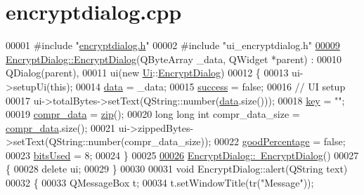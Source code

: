 \hypertarget{encryptdialog_8cpp_source}{}\section{encryptdialog.\+cpp}
\label{encryptdialog_8cpp_source}

\begin{DoxyCode}
00001 \textcolor{preprocessor}{#include "\hyperlink{encryptdialog_8h}{encryptdialog.h}"}
00002 \textcolor{preprocessor}{#include "ui\_encryptdialog.h"}
\hypertarget{encryptdialog_8cpp_source.tex_l00009}{}\hyperlink{class_encrypt_dialog_ab57e8b3a0d00c977e81f3b356657524e}{00009} \hyperlink{class_encrypt_dialog_ab57e8b3a0d00c977e81f3b356657524e}{EncryptDialog::EncryptDialog}(QByteArray \_data, QWidget *parent) :
00010     QDialog(parent),
00011     ui(new \hyperlink{namespace_ui}{Ui}::\hyperlink{class_encrypt_dialog}{EncryptDialog})
00012 \{
00013     ui->setupUi(\textcolor{keyword}{this});
00014     \hyperlink{class_encrypt_dialog_acf3a8bbce90d99ef17fec093c35b1008}{data} = \_data;
00015     \hyperlink{class_encrypt_dialog_ada4900bcd40894d9c098c65aa4066ac9}{success} = \textcolor{keyword}{false};
00016     \textcolor{comment}{// UI setup}
00017     ui->totalBytes->setText(QString::number(\hyperlink{class_encrypt_dialog_acf3a8bbce90d99ef17fec093c35b1008}{data}.size()));
00018     \hyperlink{class_encrypt_dialog_a1afdef3c665fb0d0fae06d1df8e84951}{key} = \textcolor{stringliteral}{""};
00019     \hyperlink{class_encrypt_dialog_a3e8998aa39696cbd1242f6420ef18143}{compr\_data} = \hyperlink{class_encrypt_dialog_a2bff820a3df4ddc36ecb07ed74b7138a}{zip}();
00020     \textcolor{keywordtype}{long} \textcolor{keywordtype}{long} \textcolor{keywordtype}{int} compr\_data\_size = \hyperlink{class_encrypt_dialog_a3e8998aa39696cbd1242f6420ef18143}{compr\_data}.size();
00021     ui->zippedBytes->setText(QString::number(compr\_data\_size));
00022     \hyperlink{class_encrypt_dialog_a0c821b893cfddd7a6c07bbd270ba49e9}{goodPercentage} = \textcolor{keyword}{false};
00023     \hyperlink{class_encrypt_dialog_abf638fea37fbdbaba215954e2e239860}{bitsUsed} = 8;
00024 \}
00025 
\hypertarget{encryptdialog_8cpp_source.tex_l00026}{}\hyperlink{class_encrypt_dialog_a466e283080f87ee50f172052e43e38b6}{00026} \hyperlink{class_encrypt_dialog_a466e283080f87ee50f172052e43e38b6}{EncryptDialog::~EncryptDialog}()
00027 \{
00028     \textcolor{keyword}{delete} ui;
00029 \}
00030 
00031 \textcolor{keywordtype}{void} EncryptDialog::alert(QString text)
00032 \{
00033     QMessageBox t;
00034     t.setWindowTitle(tr(\textcolor{stringliteral}{"Message"}));

\end{DoxyCode}
